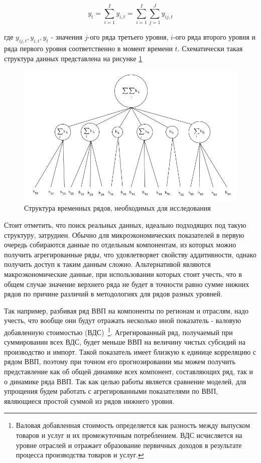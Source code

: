 \documentclass[12pt,a4paper, oneside]{extreport}
\begin{document}
\begin{equation}\label{key}
y_t = \sum_{i=1}^I y_{i,t} = \sum_{i=1}^I \sum_{j=1}^J y_{ij,t} 
\end{equation}

где $y_{ij,t}, y_{i,t},  y_{t}  $ - значения $j$-ого ряда третьего уровня, $i$-ого ряда второго уровня и ряда первого уровня соответственно в момент времени $t$. Схематически такая  структура данных представлена на рисунке \ref{fig:screenshot51}

\begin{figure}
	\centering
	\includegraphics[width=0.7\linewidth]{Screenshot51}
	\caption{Структура временных рядов, необходимых для исследования}
	\label{fig:screenshot51}
\end{figure}


Стоит отметить, что поиск реальных данных, идеально подходящих под такую структуру, затруднен. Обычно для микроэкономических показателей  в первую очередь собираются данные по отдельным компонентам, из которых  можно получить агрегированные ряды, что удовлетворяет свойству аддитивности, однако получить доступ к таким данным сложно. Альтернативой являются макроэкономические данные, при использовании которых стоит учесть, что в общем случае значение верхнего ряда не будет в точности  равно сумме нижних рядов по причине различий в методологиях для рядов разных уровней.

Так например, разбивая ряд ВВП на компоненты по регионам и отраслям, надо учесть, что вообще они будут отражать несколько иной показатель -  валовую добавленную стоимостью (ВДС)~\footnote{Валовая добавленная стоимость определяется как разность между выпуском товаров и услуг и их промежуточным потреблением. ВДС  исчисляется на уровне отраслей и отражает образование первичных доходов в результате процесса производства товаров и услуг.}. Агрегированный ряд, получаемый при суммировании всех ВДС, будет меньше ВВП на величину чистых субсидий на производство и импорт. Такой показатель имеет близкую к единице корреляцию с рядом ВВП, поэтому при точном его прогнозировании мы можем получить представление как об общей динамике всех компонент, составляющих ряд, так и о динамике ряда ВВП.  Так как целью работы является сравнение моделей, для упрощения будем работать с агрегированными показателями по ВВП, являющиеся простой суммой из рядов нижнего уровня. 
\end{document}
